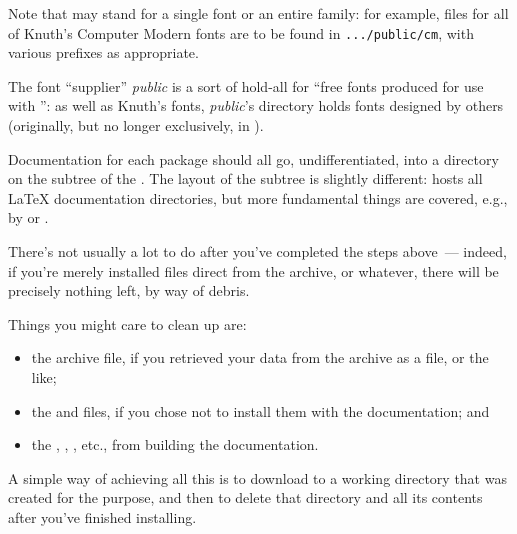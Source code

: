 Note that  may stand for a single font or an entire family:
for example, files for all of Knuth's Computer Modern fonts are to be
found in \texttt{.../public/cm}, with various prefixes as appropriate.

The font ``supplier'' \emph{public} is a sort of hold-all for
``free fonts produced for use with \AllTeX{}'': as well as Knuth's
fonts, \emph{public}'s directory holds fonts designed by others
(originally, but no longer exclusively, in \MF{}).

Documentation for each package should all go, undifferentiated, into a
directory on the  subtree of the .  The layout of
the subtree is slightly different:  hosts all
\LaTeX{} documentation directories, but more fundamental things are
covered, e.g., by  or .


There's not usually a lot to do after you've completed the steps
above~--- indeed, if you're merely installed files direct from the
archive, or whatever, there will be precisely nothing left, by way of
debris.

Things you might care to clean up are:
\begin{itemize}
\item the archive file, if you retrieved your data from the archive
  as a  file, or the like;
\item the  and  files, if you chose not
  to install them with the documentation; and
\item the , , , etc.,
  from building the documentation.
\end{itemize}
A simple way of achieving all this is to download to a working
directory that was created for the purpose, and then to delete that
directory and all its contents after you've finished installing.


